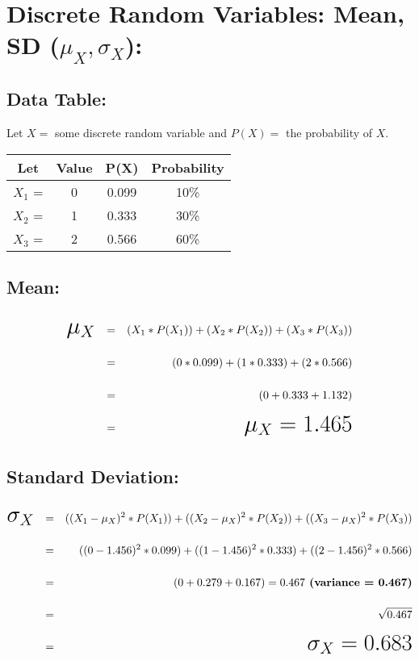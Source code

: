 \documentclass[12pt]{article}
\newcommand{\negBi}[4][2]{(#2- #3)^{#1}*{#4}}
\newcommand*{\hugeMath}[1]{\mbox{\huge$#1$}}
\begin{document}
\section*{Discrete Random Variables: Mean, SD ($\mu_{X}, \sigma_{X}$):}

  \subsection*{Data Table:}
  Let $X =$ some discrete random variable and $P(X) =$  the probability of $X$.

  \begin{table}[h!]
    \begin{center}
     \begin{tabular}{cccc}
       \toprule
       \textbf{Let} & \textbf{Value} &
       \textbf{P(X)} & \textbf{Probability} \\ %
       \midrule
       $X_{1}$ = & 0 & 0.099 & 10\% \\
       $X_{2}$ = & 1 & 0.333 & 30\% \\
       $X_{3}$ = & 2 & 0.566 & 60\% \\
       \bottomrule
     \end{tabular}
    \end{center}
  \end{table}


  \subsection*{Mean:}
  \begin{align*}
    \hugeMath{\mu_{X}} && = &&
    (X_{1} * P(X_{1})) + (X_{2} * P(X_{2})) + (X_{3} * P(X_{3})) \\
    && = && (0 * 0.099) + (1 * 0.333) + (2 * 0.566) \\
    && = &&  (0 + 0.333 + 1.132) \\
    && = && \hugeMath{\mu_{X} = 1.465}
  \end{align*}


  \subsection*{Standard Deviation:}
  \begin{align*}
    \hugeMath{\sigma_{X}} && = &&
    (\negBi{X_{1}}{\mu_{X}}{P(X_{1})}) +
    (\negBi{X_{2}}{\mu_{X}}{P(X_{2})}) +
    (\negBi{X_{3}}{\mu_{X}}{P(X_{3})}) \\
    && = && (\negBi{0}{1.456}{0.099}) +
    (\negBi{1}{1.456}{0.333}) + (\negBi{2}{1.456}{0.566}) \\
    && = &&  (0 + 0.279 + 0.167) = 0.467 \textbf{\ (variance = 0.467)}\\
    && = && \sqrt{0.467} \\ && = && \hugeMath{\sigma_{X} = 0.683}
  \end{align*}

\end{document}
